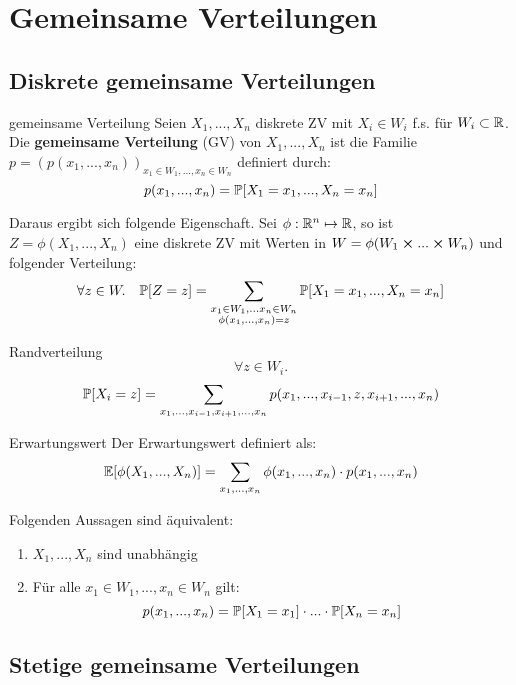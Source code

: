 \section{Gemeinsame Verteilungen}


\subsection{Diskrete gemeinsame Verteilungen}

\begin{mainbox}{gemeinsame Verteilung}
    Seien $X_1,...,X_n$ diskrete ZV mit $X_i \in W_i$ f.s. für $W_i \subset \mathbb{R}$. Die \textbf{gemeinsame Verteilung} (GV) von $X_1,...,X_n$ ist die Familie $p = (p(x_1, ..., x_n))_{x_1 \in W_1, ..., x_n \in W_n}$ definiert durch:
    $$p(x_1, ..., x_n) = \mathbb{P}[X_1 = x_1, ..., X_n = x_n]$$
\end{mainbox}

Daraus ergibt sich folgende Eigenschaft. Sei $\phi: \mathbb{R}^n \mapsto \mathbb{R}$, so ist $Z = \phi(X_1,...,X_n)$ eine diskrete ZV mit Werten in $W = \phi(W_1 \cross ... \cross W_n)$ und folgender Verteilung:
$$\forall z \in W. \quad \mathbb{P}[Z = z] = \sum\limits_{ \substack{x_1 \in W_1, ... x_n \in W_n \\ \phi(x_1, ..., x_n) = z}} \mathbb{P}[X_1 = x_1, ..., X_n = x_n]$$

\begin{mainbox}{Randverteilung}
$$\forall z \in W_i.$$ $$\mathbb{P}[X_i = z] = \sum_{x_1, ..., x_{i-1}, x_{i+1},...,x_n} p(x_1, ..., x_{i-1}, z, x_{i+1},...,x_n)$$
\end{mainbox}

\begin{mainbox}
    {Erwartungswert}
    Der Erwartungswert definiert als:
$$\mathbb{E}[\phi(X_1, ..., X_n)] = \sum\limits_{x_1,...,x_n} \phi(x_1,...,x_n) \cdot p(x_1,...,x_n)$$
\end{mainbox} 

\Satz Folgenden Aussagen sind äquivalent:
\begin{enumerate}
    \item $X_1,...,X_n$ sind unabhängig
    \item Für alle $x_1 \in W_1, ..., x_n \in W_n$ gilt: 
    $$p(x_1,...,x_n) = \mathbb{P}[X_1 = x_1] \cdot ... \cdot \mathbb{P}[X_n = x_n]$$
\end{enumerate}


\subsection{Stetige gemeinsame Verteilungen}

